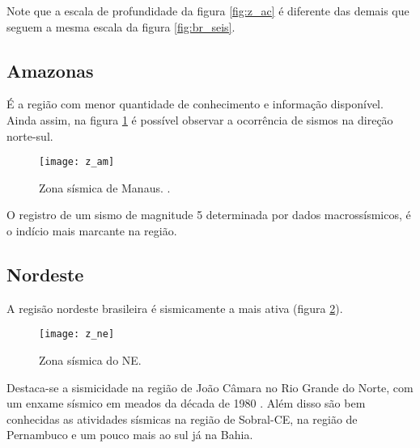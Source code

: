 Note que a escala de profundidade da figura \ref{fig:z_ac} é diferente das demais que seguem a
mesma escala da figura \ref{fig:br_seis}.


\subsection{Amazonas}
\label{sec:z_am}

É a região com menor quantidade de conhecimento e informação disponível.
Ainda assim, na figura \ref{fig:z_am} é possível observar a ocorrência de sismos
na direção norte-sul.

\begin{figure}[H]
  \centering
  \texttt{[image: z\_am]} 
  \caption{Zona sísmica de Manaus. \citet{dourado_2014}.}
  \label{fig:z_am} 
\end{figure}

O registro de um sismo de magnitude 5 determinada por dados macrossísmicos,
é o indício mais marcante na região.


\subsection{Nordeste}
\label{sec:z_ne}

A regisão nordeste brasileira é sismicamente a mais ativa (figura \ref{fig:z_ne}). 

\begin{figure}[H]
  \centering
  \texttt{[image: z\_ne]} 
  \caption{Zona sísmica do NE. \citet{dourado_2014}}
  \label{fig:z_ne} 
\end{figure}

Destaca-se a sismicidade na região de João Câmara no Rio Grande do Norte,
com um enxame sísmico em meados da década de 1980 \citep{takeya_1989, bezerra_1998}. 
Além disso são bem conhecidas as atividades sísmicas na região de Sobral-CE,
na região de Pernambuco e um pouco mais ao sul já na Bahia.


